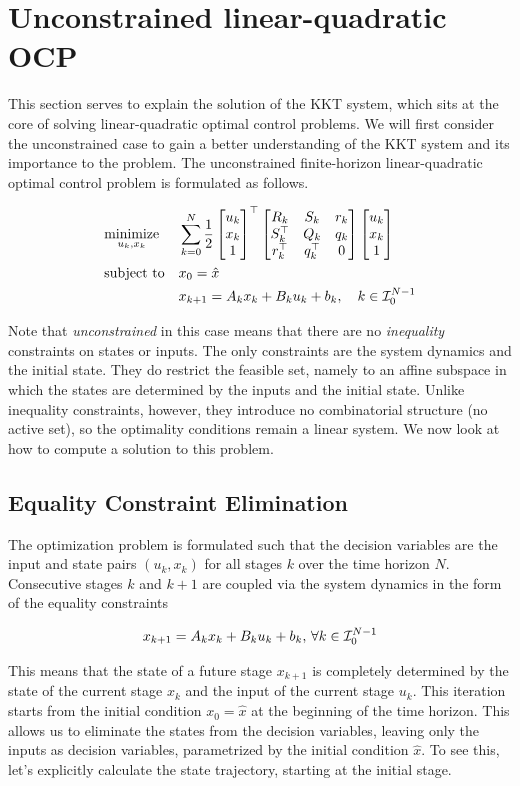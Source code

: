\section{Unconstrained linear-quadratic OCP}

This section serves to explain the solution of the KKT system, which sits at the core of solving linear-quadratic optimal control problems.
We will first consider the unconstrained case to gain a better understanding of the KKT system and its importance to the problem.
The unconstrained finite-horizon linear-quadratic optimal control problem is formulated as follows.

\[
\begin{aligned}
    & \underset{u_k, x_k}{\text{minimize}} & & \sum_{k=0}^{N} \frac{1}{2} \begin{bmatrix} u_{k} \\ x_{k} \\ 1 \end{bmatrix}^\top \begin{bmatrix} R_{k} & S_{k} & r_{k} \\ S_{k}^\top & Q_{k} & q_{k} \\ r_{k}^\top & q_{k}^\top & 0 \end{bmatrix} \begin{bmatrix} u_{k} \\ x_{k} \\ 1 \end{bmatrix} \\
    & \text{subject to} & & x_0 = \hat{x}\\
    & & & x_{k+1} = A_k x_k + B_k u_k + b_k, \quad k \in \mathcal{I}_{0}^{N-1}
\end{aligned}
\]

Note that \textit{unconstrained} in this case means that there are no \textit{inequality} constraints on states or inputs.
The only constraints are the system dynamics and the initial state.
They do restrict the feasible set, namely to an affine subspace in which the states are determined by the inputs and the initial state.
Unlike inequality constraints, however, they introduce no combinatorial structure (no active set), so the optimality conditions remain a linear system.
We now look at how to compute a solution to this problem.

\subsection{Equality Constraint Elimination}

The optimization problem is formulated such that the decision variables are the input and state pairs $(u_k, x_k)$ for all stages $k$ over the time horizon $N$.
Consecutive stages $k$ and $k+1$ are coupled via the system dynamics in the form of the equality constraints

\[
x_{k+1} = A_k x_k + B_k u_k + b_k, \, \forall k\in\mathcal{I}_{0}^{N-1}
\]

This means that the state of a future stage $x_{k+1}$ is completely determined by the state of the current stage $x_k$ and the input of the current stage $u_k$.
This iteration starts from the initial condition $x_0 = \hat{x}$ at the beginning of the time horizon.
This allows us to eliminate the states from the decision variables, leaving only the inputs as decision variables, parametrized by the initial condition $\hat{x}$.
To see this, let's explicitly calculate the state trajectory, starting at the initial stage.

